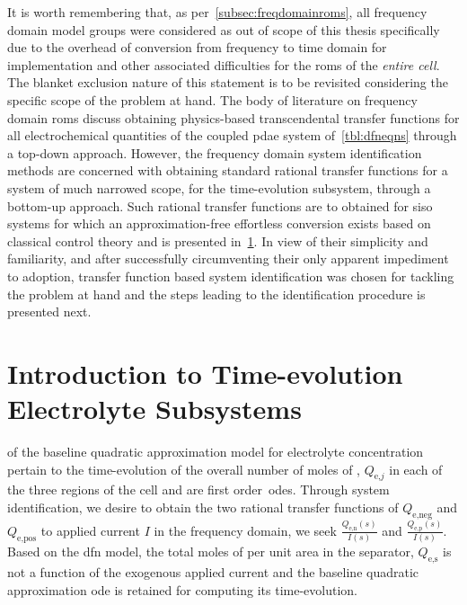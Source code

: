 It is worth remembering that, as per~\cref{subsec:freqdomainroms}, all frequency
domain model groups were considered as  out of scope of this thesis specifically
due  to  the   overhead  of  conversion  from  frequency  to   time  domain  for
implementation  and other  associated difficulties  for the  \glspl{rom} of  the
\emph{entire cell}.  The blanket  exclusion nature  of this  statement is  to be
revisited considering  the specific scope  of the problem  at hand. The  body of
literature  on  frequency  domain \glspl{rom}  discuss  obtaining  physics-based
transcendental  transfer functions  for  all electrochemical  quantities of  the
coupled  \gls{pdae} system  of~\cref{tbl:dfneqns} through  a top-down  approach.
However, the frequency  domain system identification methods  are concerned with
obtaining standard  rational transfer  functions for a  system of  much narrowed
scope, \ie{}  for the  time-evolution subsystem,  through a  bottom-up approach.
Such  rational transfer  functions are  to obtained  for \gls{siso}  systems for
which  an approximation-free  effortless  conversion exists  based on  classical
control theory and is presented  in~\cref{sec:sysidplantmodel}. In view of their
simplicity  and familiarity,  and  after successfully  circumventing their  only
apparent impediment  to adoption, transfer function  based system identification
was  chosen for  tackling the  problem  at hand  and  the steps  leading to  the
identification procedure is presented next.



\section{Introduction to Time-evolution Electrolyte Subsystems}\label{sec:sysidplantmodel}
 of the baseline
quadratic  approximation  model for  electrolyte  concentration  pertain to  the
time-evolution of the overall number  of moles of , $Q_{\text{e,}j}$ in
each  of  the  three  regions  of the  cell  and  are  first  order~\glspl{ode}.
Through system  identification, we  desire to obtain  the two  rational transfer
functions  of  $Q_\text{e,neg}$  and  $Q_\text{e,pos}$ to  applied  current  $I$
in  the  frequency  domain,  \ie{} we  seek  $\frac{Q_\text{e,n}(s)}{I(s)}$  and
$\frac{Q_\text{e,p}(s)}{I(s)}$. Based on the \gls{dfn} model, the total moles of
 per  unit area in the  separator, $Q_\text{e,s}$ is not  a function of
the exogenous applied current and the baseline quadratic approximation \gls{ode}
is retained for computing its time-evolution.

